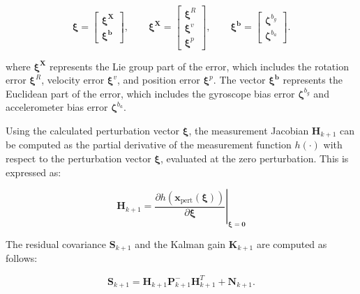 \documentclass[report.tex]{subfiles}
\begin{document}
\begin{equation}
    \boldsymbol{\xi}
    =
    \begin{bmatrix}
        \boldsymbol{\xi^{X}} \\
        \boldsymbol{\xi^{b}}
    \end{bmatrix},
    \qquad
    \boldsymbol{\xi^{X}}
    =
    \begin{bmatrix}
        \boldsymbol{\xi}^{R} \\
        \boldsymbol{\xi}^{v} \\
        \boldsymbol{\xi}^{p}
    \end{bmatrix},
    \qquad
    \boldsymbol{\xi^{b}}
    =
    \begin{bmatrix}
        \boldsymbol{\zeta}^{b_g} \\
        \boldsymbol{\zeta}^{b_a}
    \end{bmatrix}.
    \label{eq:inekfLocalErrorCoordinatesBackground}
\end{equation}

where $\boldsymbol{\xi^{X}}$ represents the Lie group part of the error, which includes the rotation error $\boldsymbol{\xi}^{R}$, velocity error $\boldsymbol{\xi}^{v}$, and position error $\boldsymbol{\xi}^{p}$. The vector $\boldsymbol{\xi^{b}}$ represents the Euclidean part of the error, which includes the gyroscope bias error $\boldsymbol{\zeta}^{b_g}$ and accelerometer bias error $\boldsymbol{\zeta}^{b_a}$.

Using the calculated perturbation vector $\boldsymbol{\xi}$, the measurement Jacobian $\boldsymbol{H}_{k+1}$ can be computed as the partial derivative of the measurement function $h(\cdot)$ with respect to the perturbation vector $\boldsymbol{\xi}$, evaluated at the zero perturbation. This is expressed as:

\begin{equation}
    \boldsymbol{H}_{k+1}
    =
    \left.
    \frac{
        \partial
        h\left(
            \boldsymbol{x}_{\mathrm{pert}}(\boldsymbol{\xi})
        \right)
    }{
        \partial\boldsymbol{\xi}
    }
    \right|_{\boldsymbol{\xi}=\boldsymbol{0}}
    \label{eq:inekfMeasurementJacobianBackground}
\end{equation}

The residual covariance $\boldsymbol{S}_{k+1}$ and the Kalman gain $\boldsymbol{K}_{k+1}$ are computed as follows:

\begin{equation}
    \boldsymbol{S}_{k+1}
    =
    \boldsymbol{H}_{k+1}
    \boldsymbol{P}^{-}_{k+1}
    \boldsymbol{H}_{k+1}^{T}
    +
    \boldsymbol{N}_{k+1}.
    \label{eq:inekfInnovationCovarianceBackground}
\end{equation}
\end{document}
